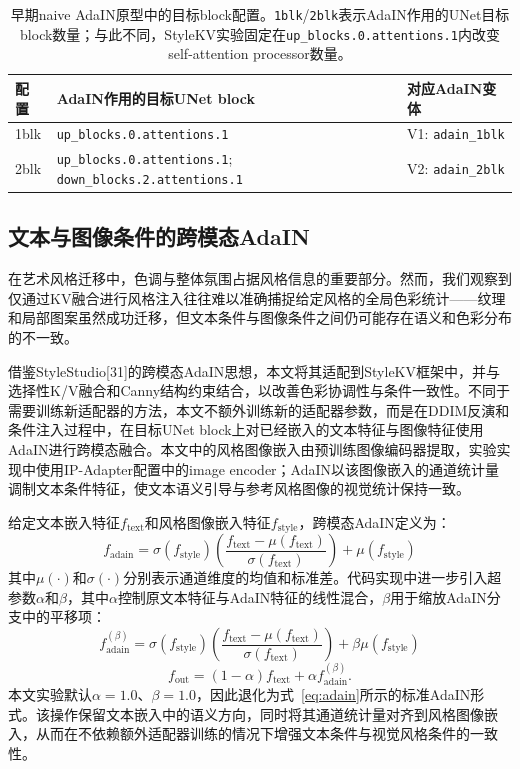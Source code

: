 \documentclass[10pt,twocolumn]{article}
\begin{document}
\begin{table}[htbp]
  \centering
  \caption{早期naive AdaIN原型中的目标block配置。\texttt{1blk}/\texttt{2blk}表示AdaIN作用的UNet目标block数量；与此不同，StyleKV实验固定在\texttt{up\_blocks.0.attentions.1}内改变self-attention processor数量。}
  \label{tab:adain_target_blocks}
  \footnotesize
  \setlength{\tabcolsep}{2pt}
  \begin{tabular}{p{0.9cm}p{4.1cm}p{2.0cm}}
    \toprule
    配置 & AdaIN作用的目标UNet block & 对应AdaIN变体 \\
    \midrule
    1blk & \texttt{up\_blocks.0.attentions.1} & V1: \texttt{adain\_1blk} \\
    2blk & \texttt{up\_blocks.0.attentions.1}; \texttt{down\_blocks.2.attentions.1} & V2: \texttt{adain\_2blk} \\
    \bottomrule
  \end{tabular}
\end{table}

\subsection{文本与图像条件的跨模态AdaIN}

在艺术风格迁移中，色调与整体氛围占据风格信息的重要部分。然而，我们观察到仅通过KV融合进行风格注入往往难以准确捕捉给定风格的全局色彩统计——纹理和局部图案虽然成功迁移，但文本条件与图像条件之间仍可能存在语义和色彩分布的不一致。

借鉴StyleStudio[31]的跨模态AdaIN思想，本文将其适配到StyleKV框架中，并与选择性K/V融合和Canny结构约束结合，以改善色彩协调性与条件一致性。不同于需要训练新适配器的方法，本文不额外训练新的适配器参数，而是在DDIM反演和条件注入过程中，在目标UNet block上对已经嵌入的文本特征与图像特征使用AdaIN进行跨模态融合。本文中的风格图像嵌入由预训练图像编码器提取，实验实现中使用IP-Adapter配置中的image encoder；AdaIN以该图像嵌入的通道统计量调制文本条件特征，使文本语义引导与参考风格图像的视觉统计保持一致。

给定文本嵌入特征$f_{\text{text}}$和风格图像嵌入特征$f_{\text{style}}$，跨模态AdaIN定义为：
\begin{equation}
f_{\text{adain}} = \sigma(f_{\text{style}}) \left( \frac{f_{\text{text}} - \mu(f_{\text{text}})}{\sigma(f_{\text{text}})} \right) + \mu(f_{\text{style}}) \label{eq:adain}
\end{equation}
其中$\mu(\cdot)$和$\sigma(\cdot)$分别表示通道维度的均值和标准差。代码实现中进一步引入超参数$\alpha$和$\beta$，其中$\alpha$控制原文本特征与AdaIN特征的线性混合，$\beta$用于缩放AdaIN分支中的平移项：
\begin{equation}
f_{\text{adain}}^{(\beta)} = \sigma(f_{\text{style}}) \left( \frac{f_{\text{text}} - \mu(f_{\text{text}})}{\sigma(f_{\text{text}})} \right) + \beta \mu(f_{\text{style}})
\end{equation}
\begin{equation}
f_{\text{out}} = (1-\alpha) f_{\text{text}} + \alpha f_{\text{adain}}^{(\beta)}.
\end{equation}
本文实验默认$\alpha=1.0$、$\beta=1.0$，因此退化为式~\ref{eq:adain}所示的标准AdaIN形式。该操作保留文本嵌入中的语义方向，同时将其通道统计量对齐到风格图像嵌入，从而在不依赖额外适配器训练的情况下增强文本条件与视觉风格条件的一致性。
\end{document}
